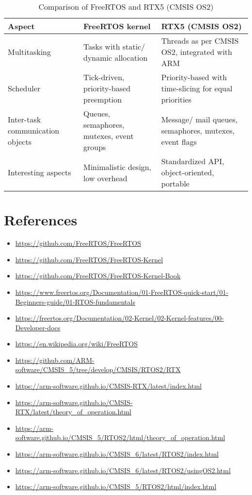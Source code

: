 \begin{table}[htbp]
    \centering
    \begin{tabular}{p{3.6cm} p{6cm} p{6cm}}
        \toprule
        \textbf{Aspect}
         &
        \textbf{FreeRTOS kernel}
         &
        \textbf{RTX5 (CMSIS OS2)}
        \\ \midrule
        Multitasking
         &
        Tasks with static/ dynamic allocation
         &
        Threads as per CMSIS OS2, integrated with ARM
        \\ \midrule
        Scheduler
         &
        Tick-driven, priority-based preemption
         &
        Priority-based with time-slicing for equal priorities
        \\ \midrule
        Inter-task communication objects
         &
        Queues, semaphores, mutexes, event groups
         &
        Message/ mail queues, semaphores, mutexes, event flags
        \\ \midrule
        Interesting aspects
         &
        Minimalistic design, low overhead
         &
        Standardized API, object-oriented, portable
        \\ \bottomrule
    \end{tabular}
    \caption{
        Comparison of FreeRTOS and RTX5 (CMSIS OS2)
    }\label{tab:comparison}
\end{table}

\section*{References}

\scriptsize
\begin{itemize}[noitemsep, leftmargin=*]
    \item \url{https://github.com/FreeRTOS/FreeRTOS}
    \item \url{https://github.com/FreeRTOS/FreeRTOS-Kernel}
    \item \url{https://github.com/FreeRTOS/FreeRTOS-Kernel-Book}
    \item \url{https://www.freertos.org/Documentation/01-FreeRTOS-quick-start/01-Beginners-guide/01-RTOS-fundamentals}
    \item \url{https://freertos.org/Documentation/02-Kernel/02-Kernel-features/00-Developer-docs}
    \item \url{https://en.wikipedia.org/wiki/FreeRTOS}
    \item \url{https://github.com/ARM-software/CMSIS_5/tree/develop/CMSIS/RTOS2/RTX}
    \item \url{https://arm-software.github.io/CMSIS-RTX/latest/index.html}
    \item \url{https://arm-software.github.io/CMSIS-RTX/latest/theory_of_operation.html}
    \item \url{https://arm-software.github.io/CMSIS_5/RTOS2/html/theory_of_operation.html}
    \item \url{https://arm-software.github.io/CMSIS_6/latest/RTOS2/index.html}
    \item \url{https://arm-software.github.io/CMSIS_6/latest/RTOS2/usingOS2.html}
    \item \url{https://arm-software.github.io/CMSIS_5/RTOS2/html/index.html}
\end{itemize}
